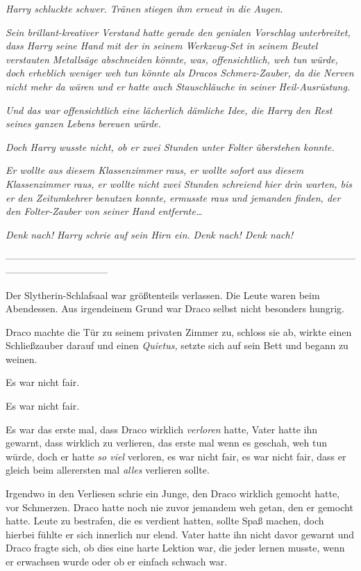 {\emph{Harry schluckte schwer. Tränen stiegen ihm erneut in die Augen.}

\emph{Sein brillant-kreativer Verstand hatte gerade den genialen Vorschlag unterbreitet, dass Harry seine Hand mit der in seinem Werkzeug-Set in seinem Beutel verstauten Metallsäge abschneiden könnte, was, offensichtlich, weh tun würde, doch erheblich weniger weh tun könnte als Dracos Schmerz-Zauber, da die Nerven nicht mehr da wären und er hatte auch Stauschläuche in seiner Heil-Ausrüstung.}

\emph{Und das war offensichtlich eine lächerlich dämliche Idee, die Harry den Rest seines ganzen Lebens bereuen würde.}

\emph{Doch Harry wusste nicht, ob er zwei Stunden unter Folter überstehen konnte.}

\emph{Er wollte aus diesem Klassenzimmer} \emph{\emph{raus,}} \emph{er wollte} \emph{\emph{sofort}} \emph{aus diesem Klassenzimmer raus, er wollte nicht zwei Stunden schreiend hier drin warten, bis er den Zeitumkehrer benutzen konnte,} \emph{er\emph{musste raus}} \emph{und jemanden finden, der den Folter-Zauber von seiner Hand entfernte…}

\emph{\emph{Denk nach!}} \emph{Harry schrie auf sein Hirn ein.} \emph{\emph{Denk nach! Denk nach!}}

--------------------------------------------------------------------------------------------------------------------------------------------

Der Slytherin-Schlafsaal war größtenteils verlassen. Die Leute waren beim Abendessen. Aus irgendeinem Grund war Draco selbst nicht besonders hungrig.

Draco machte die Tür zu seinem privaten Zimmer zu, schloss sie ab, wirkte einen Schließzauber darauf und einen \emph{Quietus,} setzte sich auf sein Bett und begann zu weinen.

Es war nicht fair.

Es war nicht fair.

Es war das erste mal, dass Draco wirklich \emph{verloren} hatte, Vater hatte ihn gewarnt, dass wirklich zu verlieren, das erste mal wenn es geschah, weh tun würde, doch er hatte \emph{so viel} verloren, es war nicht fair, es war nicht fair, dass er gleich beim allerersten mal \emph{alles} verlieren sollte.

Irgendwo in den Verliesen schrie ein Junge, den Draco wirklich gemocht hatte, vor Schmerzen. Draco hatte noch nie zuvor jemandem weh getan, den er gemocht hatte. Leute zu bestrafen, die es verdient hatten, sollte Spaß machen, doch hierbei fühlte er sich innerlich nur elend. Vater hatte ihn nicht davor gewarnt und Draco fragte sich, ob dies eine harte Lektion war, die jeder lernen musste, wenn er erwachsen wurde oder ob er einfach schwach war.

}
